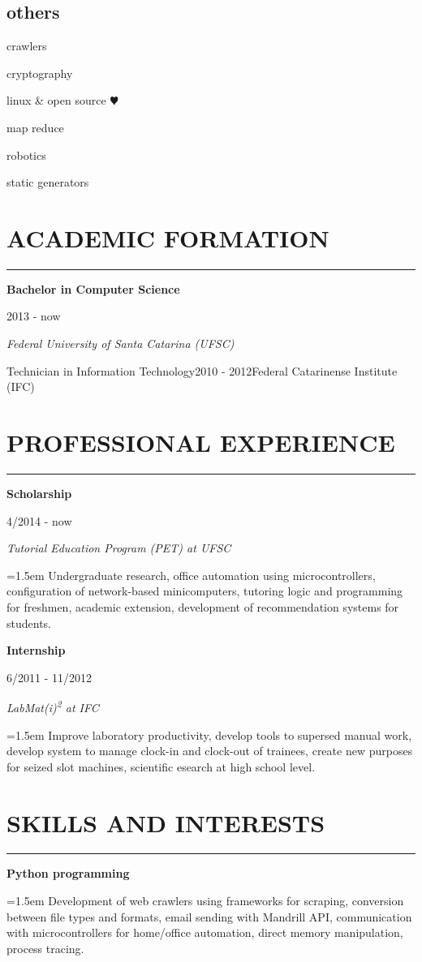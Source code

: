 \documentclass{article}
\def\emcolor{blue!25!black}
\newcommand{\fgem}{\color{\emcolor}}%
\newcommand{\vsep}{\noindent\fgem\hspace{0.75em}\vrule\hspace{0.75em}}
\newcommand{\formationentry}[4]{%
	\noindent \textbf{#1} \hfill
	\colorbox{\emcolor}{%
		\parbox[c][1em]{8em}{%
			\hfill \color{white} #2
		}
	} \par
	\noindent \textit{#3} \par
	\normalsize
	\vspace{1em}
}
\newcommand{\experienceentry}[4]{%
	\noindent \textbf{#1} \hfill
	\colorbox{\emcolor}{%
		\parbox[c][1em]{8em}{%
			\hfill \color{white} #2
		}
	} \par
	\noindent \textit{#3} \par
	\noindent \hangindent=1.5em \hangafter=0 \small #4 \par
	\normalsize
	\vspace{1em}
}
\newcommand{\skillentry}[2]{%
	\noindent \textbf{#1} \hfill \par
	\noindent \hangindent=1.5em \hangafter=0 \small #2 \par
	\normalsize
	\vspace{1em}
}
\newenvironment{aside}{%
\noindent
\begin{minipage}[t]{\dimexpr0.25\textwidth}%
\let\oldsection\section
\let\oldsubsection\subsection
\renewcommand{\section}[1]{\oldsection*{\fgem ##1}}
\renewcommand{\subsection}[1]{\oldsubsection*{\small ##1}\vspace{-0.5em}}
\begin{center}%
}{%
\end{center}%
\let\subsection\oldsubsection
\let\section\oldsection
\end{minipage}%
}
\newenvironment{main}{%
\noindent
\begin{minipage}[t]{\dimexpr0.75\textwidth-1.5em}%
\let\oldsection\section
\renewcommand{\section}[1]{\oldsection*{\uppercase{\fgem ##1}}\vspace{-0.5em}\hrule\vspace{1em}}
}{%
\let\section\oldsection
\end{minipage}%
}
\begin{document}
\begin{aside}
\subsection{others}
\begin{itemize*}
\item{crawlers}
\item{cryptography}
\item{linux \& open source \color{red}$\varheartsuit$}
\item{map reduce}
\item{robotics}
\item{static generators}
\end{itemize*}

\raggedleft


\end{aside}%
\vsep%
\begin{main}%
\section{Academic Formation}
\formationentry{Bachelor in Computer Science}{2013 - now}{Federal University
of Santa Catarina (UFSC)}

\formationentry{Technician in Information Technology}{2010 - 2012}{Federal
Catarinense Institute (IFC)}


\section{Professional Experience}
\experienceentry{Scholarship}{4/2014 - now}{Tutorial Education Program (PET) at
UFSC}{Undergraduate research, office automation using microcontrollers, configuration of network-based minicomputers, tutoring logic and programming for freshmen, academic extension, development of recommendation systems for students.}

\experienceentry{Internship}{6/2011 - 11/2012}{LabMat(i)\textsuperscript{2} at
IFC}{Improve laboratory productivity, develop tools to supersed manual work, develop system to manage clock-in and clock-out of trainees, create new purposes for seized slot machines, scientific esearch at high school level.}


\section{Skills and Interests}
\skillentry{Python programming}{Development of web crawlers using frameworks
for scraping, conversion between file types and formats, email sending with
Mandrill API, communication with microcontrollers for home/office automation,
direct memory manipulation, process tracing.}


\end{main}
\end{document}
